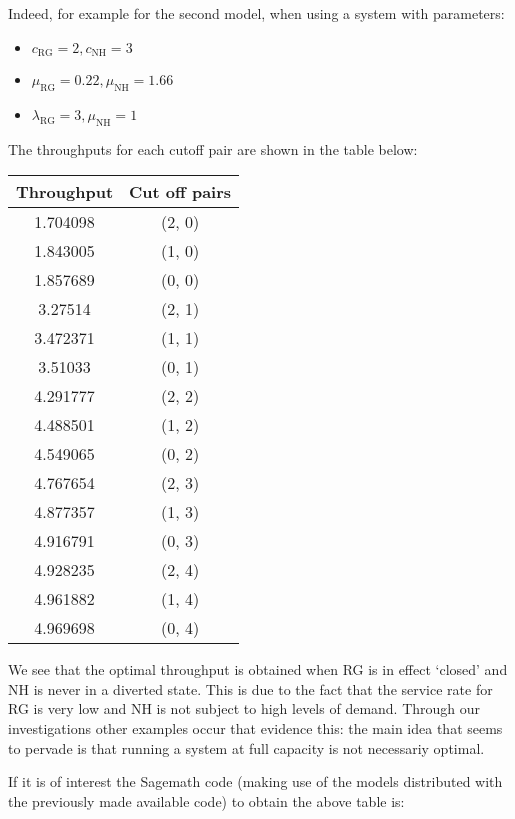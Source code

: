 \documentclass{article}
\begin{document}
Indeed, for example for the second model, when using a system with parameters:

\begin{itemize}
    \item \(c_{\text{RG}}=2, c_{\text{NH}}=3\)
    \item \(\mu_{\text{RG}}=0.22, \mu_{\text{NH}}=1.66\)
    \item \(\lambda_{\text{RG}}=3, \mu_{\text{NH}}=1\)
\end{itemize}

The throughputs for each cutoff pair are shown in the table below:

\begin{center}
    \begin{tabular}{cc}
        \toprule
        Throughput & Cut off pairs\\
        \midrule
        1.704098 &(2, 0)\\
        1.843005 &(1, 0)\\
        1.857689 &(0, 0)\\
        3.27514 &(2, 1)\\
        3.472371 &(1, 1)\\
        3.51033 &(0, 1)\\
        4.291777 &(2, 2)\\
        4.488501 &(1, 2)\\
        4.549065 &(0, 2)\\
        4.767654 &(2, 3)\\
        4.877357 &(1, 3)\\
        4.916791 &(0, 3)\\
        4.928235 &(2, 4)\\
        4.961882 &(1, 4)\\
        4.969698 &(0, 4)\\
        \bottomrule
    \end{tabular}
\end{center}

We see that the optimal throughput is obtained when RG is in effect `closed'
and NH is never in a diverted state. This is due to the fact that the service
rate for RG is very low and NH is not subject to high levels of demand. Through our investigations other examples occur that evidence this: the main idea that seems to pervade is that running a system at full capacity is not necessariy optimal.

If it is of interest the Sagemath code (making use of the models distributed
with the previously made available code) to obtain the above table is:
\end{document}
